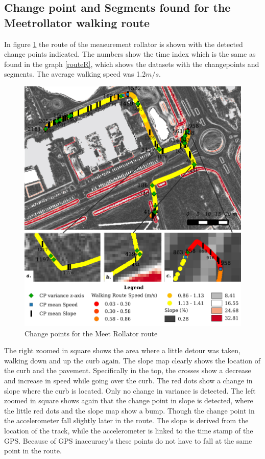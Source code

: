 \clearpage

\subsection{Change point and Segments found for the Meetrollator walking route}
In figure \ref{routeM} the route of the measurement rollator is shown with the detected change points indicated. The numbers show the time index which is the same as found in the graph \ref{routeR}, which shows the datasets with the changepoints and segments. The average walking speed was 1.2$m/s$. 

\begin{figure}[ht]
\includegraphics[width=\textwidth]{img/R_meetrollatorroute.pdf}
\centering
\caption{Change points for the Meet Rollator route\label{routeM}}
\end{figure} 

\clearpage

The right zoomed in square shows the area where a little detour was taken, walking down and up the curb again. The slope map clearly shows the location of the curb and the pavement. Specifically in the top, the crosses show a decrease and increase in speed while going over the curb. The red dots show a change in slope where the curb is located. Only no change in variance is detected. The left zoomed in square shows again that the change point in slope is detected, where the little red dots and the slope map show a bump. Though the change point in the accelerometer fall slightly later in the route. 
The slope is derived from the location of the track, while the accelerometer is linked to the time stamp of the GPS. Because of GPS inaccuracy's these points do not have to fall at the same point in the route.

